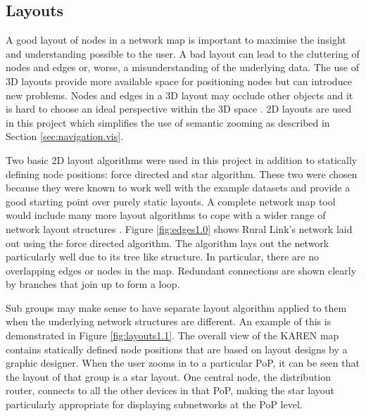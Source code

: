 \documentclass[11pt, a4paper]{article}
\begin{document}
\subsection{Layouts}
\label{sec:layouts.vis}

% 

% 

A good layout of nodes in a network map is important to maximise the insight and
understanding possible to the user. A bad layout can lead to the cluttering of
nodes and edges or, worse, a misunderstanding of the underlying data. The use of
3D layouts provide more available space for positioning nodes but can introduce
new problems. Nodes and edges in a 3D layout may occlude other objects and it is
hard to choose an ideal perspective within the 3D space \cite{Lai_1998}. 2D
layouts are used in this project which simplifies the use of semantic zooming as
described in Section \ref{sec:navigation.vis}. 

Two basic 2D layout algorithms were used in this project in addition to
statically defining node positions: force directed and star algorithm. These
two were chosen because they were known to work well with the example datasets
and provide a good starting point over purely static layouts. A complete network
map tool would include many more layout algorithms to cope with a wider range of
network layout structures \cite{Paul_2000}. Figure \ref{fig:edges1.0} shows
Rural Link's network laid out using the force directed algorithm. The algorithm
lays out the network particularly well due to its tree like structure. In
particular, there are no overlapping edges or nodes in the map. Redundant
connections are shown clearly by branches that join up to form a loop. 

Sub groups may make sense to have separate layout algorithm applied to them when
the underlying network structures are different. An example of this is
demonstrated in Figure \ref{fig:layouts1.1}. The overall view of the KAREN map
contains statically defined node positions that are based on layout designs by a
graphic designer. When the user zooms in to a particular PoP, it can be seen
that the layout of that group is a star layout. One central node, the
distribution router, connects to all the other devices in that PoP, making the
star layout particularly appropriate for displaying subnetworks at the PoP
level.
\end{document}
